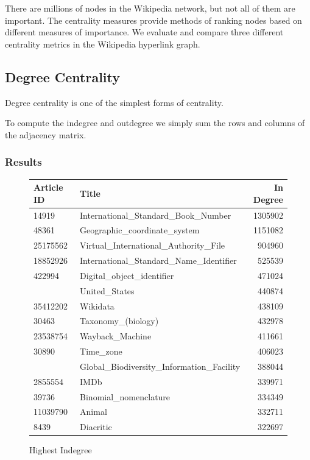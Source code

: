 \documentclass{article}
\begin{document}
There are millions of nodes in the Wikipedia network, but not all of them are important.
The centrality measures provide methods of ranking nodes based on different measures of importance.
We evaluate and compare three different centrality metrics in the Wikipedia hyperlink graph.

\subsection{Degree Centrality}

Degree centrality is one of the simplest forms of centrality.

To compute the indegree and outdegree we simply sum the rows and columns of the adjacency matrix.

\subsubsection{Results}
\begin{figure}[H]
    \centering
    \caption{Highest Indegree}
    \begin{tabular}{llr}
        \toprule
        Article ID & Title & In Degree\\
        \midrule
        14919 & International\_Standard\_Book\_Number & 1305902\\
        48361 & Geographic\_coordinate\_system & 1151082\\
        25175562 & Virtual\_International\_Authority\_File & 904960\\
        18852926 & International\_Standard\_Name\_Identifier & 525539\\
        422994 & Digital\_object\_identifier & 471024\\
        \addlinespace
        3434750 & United\_States & 440874\\
        35412202 & Wikidata & 438109\\
        30463 & Taxonomy\_(biology) & 432978\\
        23538754 & Wayback\_Machine & 411661\\
        30890 & Time\_zone & 406023\\
        \addlinespace
        2987862 & Global\_Biodiversity\_Information\_Facility & 388044\\
        2855554 & IMDb & 339971\\
        39736 & Binomial\_nomenclature & 334349\\
        11039790 & Animal & 332711\\
        8439 & Diacritic & 322697\\
        \bottomrule
    \end{tabular}
\end{figure}
    
\end{document}
